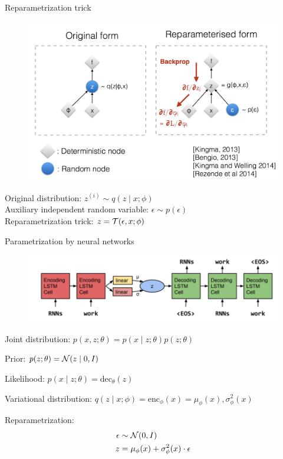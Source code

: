 \documentclass[usenames,dvipsnames,notes]{beamer}
\begin{document}
\begin{frame}
    {Reparametrization trick}
    \begin{figure} 
        \includegraphics[width=.7\textwidth]{figures/reparam}
    \end{figure}
    \vspace{-1em}
    Original distribution: $z^{(i)}\sim q(z\mid x; \phi)$\\
    Auxiliary independent random variable: $\epsilon\sim p(\epsilon)$ \\
    Reparametrization trick: $z = \mathcal{T}(\epsilon, x; \phi)$
\end{frame}

\begin{frame}
    {Parametrization by neural networks}
    \begin{figure}
        \includegraphics[width=.8\textwidth]{figures/vae}
    \end{figure}
    \vspace{-1em}
    Joint distribution: $p(x,z;\theta) = p(x\mid z;\theta) p(z;\theta)$

    Prior: $p(z;\theta) = \mathcal{N}(z\mid 0, I)$

    Likelihood: $p(x\mid z;\theta) = \text{dec}_\theta(z)$

    Variational distribution: $q(z\mid x; \phi) = \text{enc}_\phi(x) = \mu_\phi(x), \sigma^2_\phi(x)$

    Reparametrization:
    \begin{align*}
        \epsilon &\sim \mathcal{N}(0, I) \\
        z &= \mu_\phi(x) + \sigma^2_\phi(x)\cdot \epsilon
    \end{align*}
\end{frame}
\end{document}

